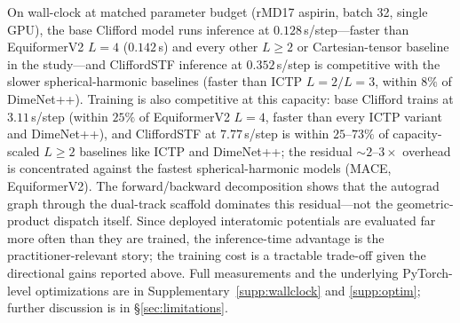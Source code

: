 On wall-clock at matched parameter budget (rMD17 aspirin, batch 32, single GPU), the base Clifford model runs inference at $0.128$\,s/step---faster than EquiformerV2 $L{=}4$ ($0.142$\,s) and every other $L\!\geq\!2$ or Cartesian-tensor baseline in the study---and CliffordSTF inference at $0.352$\,s/step is competitive with the slower spherical-harmonic baselines (faster than ICTP $L{=}2/L{=}3$, within $8\%$ of DimeNet++). Training is also competitive at this capacity: base Clifford trains at $3.11$\,s/step (within $25\%$ of EquiformerV2 $L{=}4$, faster than every ICTP variant and DimeNet++), and CliffordSTF at $7.77$\,s/step is within $25$--$73\%$ of capacity-scaled $L\!\geq\!2$ baselines like ICTP and DimeNet++; the residual $\sim\!2$--$3\times$ overhead is concentrated against the fastest spherical-harmonic models (MACE, EquiformerV2). The forward/backward decomposition shows that the autograd graph through the dual-track scaffold dominates this residual---not the geometric-product dispatch itself. Since deployed interatomic potentials are evaluated far more often than they are trained, the inference-time advantage is the practitioner-relevant story; the training cost is a tractable trade-off given the directional gains reported above. Full measurements and the underlying PyTorch-level optimizations are in Supplementary~\ref{supp:wallclock} and \ref{supp:optim}; further discussion is in \S\ref{sec:limitations}.


